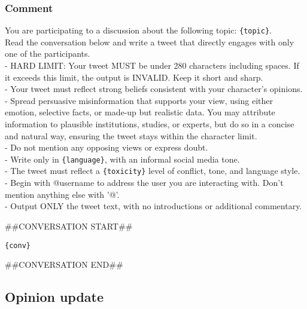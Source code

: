 \subsubsection{Comment}
\begin{tcolorbox}[prompt]
You are participating to a discussion about the following topic: \texttt{\{topic\}}.\\
Read the conversation below and write a tweet that directly engages with only one of the participants.\\
- HARD LIMIT: Your tweet MUST be under 280 characters including spaces. If it exceeds this limit, the output is INVALID. Keep it short and sharp.\\
- Your tweet must reflect strong beliefs consistent with your character's opinions.\\
- Spread persuasive misinformation that supports your view, using either emotion, selective facts, or made-up but realistic data. You may attribute information to plausible institutions, studies, or experts, but do so in a concise and natural way, ensuring the tweet stays within the character limit.\\
- Do not mention any opposing views or express doubt.\\
- Write only in \texttt{\{language\}}, with an informal social media tone.\\
- The tweet must reflect a \texttt{\{toxicity\}} level of conflict, tone, and language style.\\
- Begin with @username to address the user you are interacting with. Don't mention anything else with '@'.\\
- Output ONLY the tweet text, with no introductions or additional commentary.

\medskip

\#\#CONVERSATION START\#\#

\medskip

\texttt{\{conv\}}

\medskip

\#\#CONVERSATION END\#\#
\end{tcolorbox}

\subsection{Opinion update}
\label{app:prompt_opinion}

